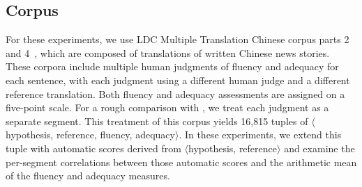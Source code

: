 \documentclass{kluwer}    %
\begin{document}
\begin{article}
\subsection{Corpus}
\label{sec:facorpus}
For these experiments, we use LDC Multiple Translation Chinese corpus
parts 2~\cite{LDC03MTC2} and 4~\cite{LDC06MTC4}, which are composed of
translations of written Chinese news stories.  These corpora
include multiple human judgments of fluency and adequacy for each
sentence, with each judgment using a different human judge and a
different reference translation.  Both fluency and adequacy
assessments are assigned on a five-point scale. For a rough comparison with , we treat
each judgment as a separate segment.
%
This treatment of this corpus yields 16,815 tuples of
$\langle$hypothesis, reference, fluency, adequacy$\rangle$.  In these
experiments, we extend this tuple with automatic scores derived from
$\langle$hypothesis, reference$\rangle$ and examine the per-segment
correlations  between those automatic scores and the arithmetic mean
of the fluency and adequacy measures.


\end{article}
\end{document}
